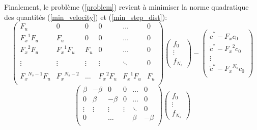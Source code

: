 \documentclass[10pt,a4paper]{article}
\begin{document}
Finalement, le problème (\ref{problem}) revient à minimiser la norme quadratique des quantités (\ref{min_velocity}) et (\ref{min_step_dist}):
\begin{equation}\label{min_velocity}
\begin{pmatrix} 
 F_u        		& 0 	 		& 0 &0& \hdots & 0 \\
 {F_x}^1 F_u 		& F_u 	 		& 0 &0& \hdots & 0 \\
 {F_x}^2 F_u 		& {F_x}^1 F_u 	& F_u &0& \hdots & 0 \\ \\
 \vdots	 			&\vdots 	& \vdots & \vdots &  \ddots & 0 \\ \\
 {F_x}^{N_s-1} F_u 	&  {F_x}^{N_s-2}	& \hdots& {F_x}^2 F_u& {F_x}^1 F_u  & F_u \\
\end{pmatrix}\begin{pmatrix} 
f_0 \\
\vdots \\
f_{N_s}
\end{pmatrix} - \begin{pmatrix} 
\dot{c}^*-{F_x} c_0\\
\dot{c}^*-{F_x}^2 c_0\\
\vdots \\
\dot{c}^*-{F_x}^{N_s} c_0\\
\end{pmatrix}
\end{equation}
\begin{equation}\label{min_step_dist}
\begin{pmatrix} 
 \beta    & -\beta 	 	& 0 &0& \hdots & 0 \\
 0&\beta    & -\beta 	 	& 0 & \hdots & 0 \\
 \vdots	 			&\vdots 	& \vdots & \vdots &  \ddots & 0 \\ 
 0       		&  	 		&    \hdots&  & \beta    & -\beta \\
\end{pmatrix}
\begin{pmatrix} 
f_0 \\
\vdots \\
f_{N_s}
\end{pmatrix}
\end{equation}
\end{document}

